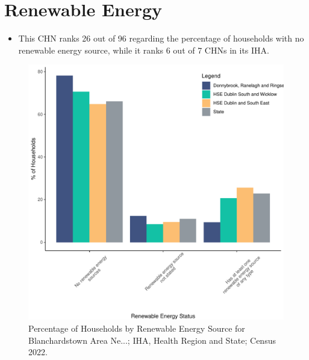 \documentclass{article}
\begin{document}
\section{Renewable Energy}\label{sect:RE}
\begin{itemize}
\item This CHN ranks  26 out of 96 regarding the percentage of households with no renewable energy source, while it ranks   6 out of 7 CHNs in its IHA.
\end{itemize}
\begin{figure}[H]
	\centering
	\includegraphics[width = 140mm]{../figures/RenewableEnergyED.pdf}
	\caption{Percentage of Households by Renewable Energy Source for Blanchardstown Area Ne...; IHA, Health Region and State; Census 2022.}
	\label{fig:vbnv}
	\end{figure}
\end{document}
